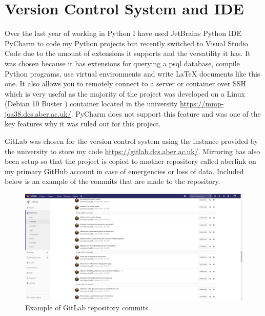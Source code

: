\section{Version Control System and IDE}

Over the last year of working in Python I have used JetBrains Python IDE PyCharm \cite{pycharm} to code my Python projects but recently switched to Visual Studio Code \cite{vsc} due to the amount of extensions it supports and the versatility it has. It was chosen because it has extensions for querying a psql \cite{psql} database, compile Python programs, use virtual environments and write LaTeX documents like this one. It also allows you to remotely connect to a server or container over SSH which is very useful as the majority of the project was developed on a Linux (Debian 10 Buster \cite{debian}) container located in the university \href{https://mmp-joa38.dcs.aber.ac.uk/}{https://mmp-joa38.dcs.aber.ac.uk/}. PyCharm does not support this feature and was one of the key features why it was ruled out for this project.

GitLab was chosen for the version control system using the instance provided by the university to store my code \href{https://gitlab.dcs.aber.ac.uk/}{https://gitlab.dcs.aber.ac.uk/}. Mirroring has also been setup so that the project is copied to another repository called aberlink on my primary GitHub account in case of emergencies or loss of data. Included below is an example of the commits that are made to the repository.
\begin{figure}[H]
	\centering
	\includegraphics[width=1\textwidth]{Figures/gitlab.png}	
	\caption{Example of GitLab repository commits}
	\label{fig:gitlab}
\end{figure}
